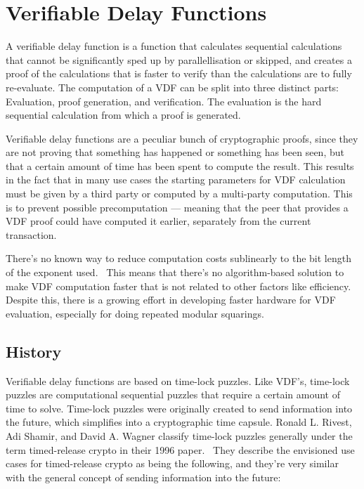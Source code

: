 \chapter{Verifiable Delay Functions}
\label{Verifiable Delay Functions}

A verifiable delay function is a function that calculates sequential calculations that cannot be significantly sped up by parallellisation or skipped, and creates a proof of the calculations that is faster to verify than the calculations are to fully re-evaluate. The computation of a VDF can be split into three distinct parts: Evaluation, proof generation, and verification. The evaluation is the hard sequential calculation from which a proof is generated.  

Verifiable delay functions are a peculiar bunch of cryptographic proofs, since they are not proving that something has happened or something has been seen, but that a certain amount of time has been spent to compute the result. This results in the fact that in many use cases the starting parameters for VDF calculation must be given by a third party or computed by a multi-party computation. This is to prevent possible precomputation --- meaning that the peer that provides a VDF proof could have computed it earlier, separately from the current transaction.

There's no known way to reduce computation costs sublinearly to the bit length of the exponent used.~\cite{Boneh2018-sm} This means that there's no algorithm-based solution to make VDF computation faster that is not related to other factors like efficiency. Despite this, there is a growing effort in developing faster hardware for VDF evaluation, especially for doing repeated modular squarings.

\section{History}
Verifiable delay functions are based on time-lock puzzles. Like VDF's, time-lock puzzles are computational sequential puzzles that require a certain amount of time to solve.\cite{Rivest_undated-qr} Time-lock puzzles were originally created to send information into the future, which simplifies into a cryptographic time capsule. Ronald L. Rivest, Adi Shamir, and David A. Wagner classify time-lock puzzles generally under the term timed-release crypto in their 1996 paper.~\cite{Rivest_undated-qr} They describe the envisioned use cases for timed-release crypto as being the following, and they're very similar with the general concept of sending information into the future:

